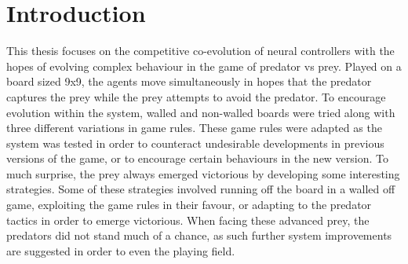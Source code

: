 \section{Introduction}

This thesis focuses on the competitive co-evolution of neural controllers with the hopes of evolving complex behaviour in the game of predator vs prey. Played on a board sized 9x9, the agents move simultaneously in hopes that the predator captures the prey while the prey attempts to avoid the predator. To encourage evolution within the system, walled and non-walled boards were tried along with three different variations in game rules. These game rules were adapted as the system was tested in order to counteract undesirable developments in previous versions of the game, or to encourage certain behaviours in the new version. To much surprise, the prey always emerged victorious by developing some interesting strategies. Some of these strategies involved running off the board in a walled off game, exploiting the game rules in their favour, or adapting to the predator tactics in order to emerge victorious. When facing these advanced prey, the predators did not stand much of a chance, as such further system improvements are suggested in order to even the playing field.